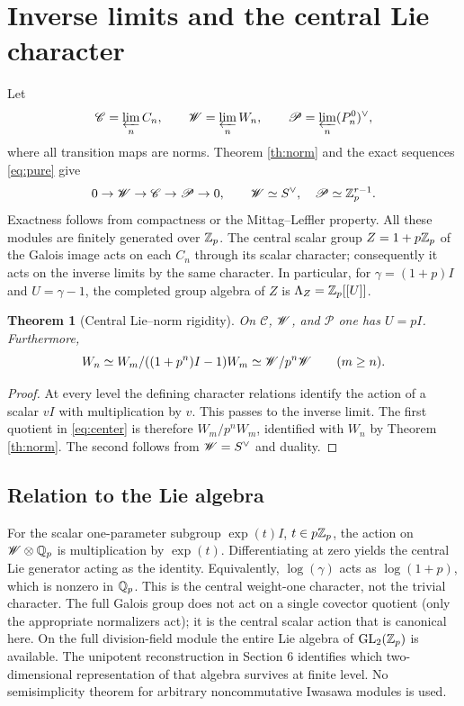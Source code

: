 \documentclass[11pt,a4paper]{article}
\newtheorem{theorem}{Theorem}[section]
\theoremstyle{definition}\newtheorem{definition}[theorem]{Definition}
\theoremstyle{remark}\newtheorem{remark}[theorem]{Remark}
\numberwithin{equation}{section}
\begin{document}
\section{Inverse limits and the central Lie character}\label{sec:center}
Let
\[
\mathscr C=\varprojlim_n C_n,\qquad \mathscr W=\varprojlim_n W_n,
\qquad \mathscr P=\varprojlim_n(P_n^0)^\vee,
\]
where all transition maps are norms. Theorem \ref{th:norm} and the exact sequences \eqref{eq:pure} give
\begin{equation}\label{eq:invseq}
0\to\mathscr W\to\mathscr C\to\mathscr P\to0,
\qquad \mathscr W\simeq S^\vee,\quad \mathscr P\simeq\mathbb Z_p^{r-1}.
\end{equation}
Exactness follows from compactness or the Mittag--Leffler property. All these modules are finitely generated over $\mathbb Z_p$. The central scalar group $Z=1+p\mathbb Z_p$ of the Galois image acts on each $C_n$ through its scalar character; consequently it acts on the inverse limits by the same character. In particular, for $\gamma=(1+p)I$ and $U=\gamma-1$, the completed group algebra of $Z$ is $\Lambda_Z=\mathbb Z_p[[U]]$.
\begin{theorem}[Central Lie--norm rigidity]\label{th:center}
On $\mathscr C$, $\mathscr W$, and $\mathscr P$ one has $U=pI$. Furthermore,
\begin{equation}\label{eq:center}
W_n\simeq W_m/((1+p^n)I-1)W_m
\simeq\mathscr W/p^n\mathscr W\qquad(m\ge n).
\end{equation}
\end{theorem}
\begin{proof}
At every level the defining character relations identify the action of a scalar $vI$ with multiplication by $v$. This passes to the inverse limit. The first quotient in \eqref{eq:center} is therefore $W_m/p^nW_m$, identified with $W_n$ by Theorem \ref{th:norm}. The second follows from $\mathscr W=S^\vee$ and duality.\end{proof}

\subsection*{Relation to the Lie algebra}
For the scalar one-parameter subgroup $\exp(t)I$, $t\in p\mathbb Z_p$, the action on $\mathscr W\otimes\mathbb Q_p$ is multiplication by $\exp(t)$. Differentiating at zero yields the central Lie generator acting as the identity. Equivalently, $\log(\gamma)$ acts as $\log(1+p)$, which is nonzero in $\mathbb Q_p$. This is the central weight-one character, not the trivial character. The full Galois group does not act on a single covector quotient (only the appropriate normalizers act); it is the central scalar action that is canonical here. On the full division-field module the entire Lie algebra of $\operatorname{GL}_2(\mathbb Z_p)$ is available. The unipotent reconstruction in Section 6 identifies which two-dimensional representation of that algebra survives at finite level. No semisimplicity theorem for arbitrary noncommutative Iwasawa modules is used.
\end{document}
